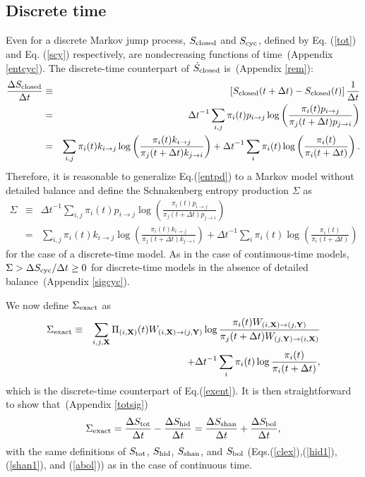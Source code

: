 \documentclass[aps,pre,amsmath,amssymb,floatfix,preprint,nofootinbib]{revtex4}
\begin{document}
\subsection{Discrete time}
Even for a discrete Markov jump process, $S_{\rm closed}$ and $S_{\rm cyc}$, defined by Eq. (\ref{tot}) and Eq. (\ref{scy}) respectively, are nondecreasing functions of time~(Appendix \ref{entcyc})\cite{morimoto}. 
The discrete-time counterpart of $\dot S_{\rm closed}$ is~(Appendix \ref{rem}):
\begin{eqnarray}
\frac{\Delta S_{\rm closed}}{\Delta t} &\equiv& \left[ S_{\rm closed}(t+\Delta t) - S_{\rm closed}(t)\right]\frac{1}{\Delta t} \nonumber\\
&=& {\Delta t}^{-1} \sum_{i,j} \pi_i(t) p_{i \to j}   \log \left(\frac{\pi_i(t) p_{i \to j}}{\pi_j(t +\Delta t) p_{j \to i}}\right) \nonumber\\
&=& \sum_{i,j} \pi_i(t) k_{i \to j}   \log \left(\frac{\pi_i(t) k_{i \to j}}{\pi_j(t +\Delta t) k_{j \to i}}\right) + {\Delta t}^{-1} \sum_{i} \pi_i(t)  \log \left(\frac{\pi_i(t) }{\pi_i(t +\Delta t) }\right)
.\label{entpd}
\end{eqnarray}
 Therefore, it is reasonable to generalize Eq.(\ref{entpd}) to a Markov model without detailed balance and define the Schnakenberg entropy production $\Sigma$ as
\begin{eqnarray}
\Sigma &\equiv& {\Delta t}^{-1} \sum_{i,j} \pi_i(t) p_{i \to j}   \log \left(\frac{\pi_i(t) p_{i \to j}}{\pi_j(t +\Delta t) p_{j \to i}}\right)\nonumber\\
&=& \sum_{i,j} \pi_i(t) k_{i \to j}   \log \left(\frac{\pi_i(t) k_{i \to j}}{\pi_j(t +\Delta t) k_{j \to i}}\right) + {\Delta t}^{-1} \sum_{i} \pi_i(t)   \log \left(\frac{\pi_i(t) }{\pi_i(t +\Delta t) }\right)
\label{schd}
\end{eqnarray}
for the case of a discrete-time model.
As in the case of continuous-time models, $\Sigma > {\Delta S_{\rm cyc}}/{\Delta t} \ge 0$ for discrete-time models in the absence of detailed balance~(Appendix \ref{sigcyc}). 

We now define $\Sigma_{\rm exact}$ as 
\begin{eqnarray}
\Sigma_{\rm exact} &\equiv& \sum_{i,j,{\bf X}}  \Pi_{(i,{\bf X})}(t) W_{(i,{\bf X}) \to (j,{\bf Y})} \log \frac{\pi_{i}(t) W_{(i,{\bf X}) \to (j,{\bf Y})}}{\pi_{j}(t+ \Delta t) W_{(j,{\bf Y}) \to (i,{\bf X})}}\nonumber\\
&&+ \Delta t^{-1} \sum_{i } \pi_{i}(t)  \log \frac{\pi_{i}(t) }{\pi_{i}(t+ \Delta t)}, \label{exd}
\end{eqnarray}
which is the discrete-time counterpart of Eq.(\ref{exent}). It is then straightforward to show that~(Appendix \ref{totsig}) 
\begin{equation}
\Sigma_{\rm exact} = \frac{\Delta S_{\rm tot}}{\Delta t}- \frac{\Delta S_{\rm hid}}{\Delta t} = \frac{\Delta S_{\rm shan}}{\Delta t}+ \frac{\Delta S_{\rm bol}}{\Delta t},\label{fin1}
\end{equation}
with the same definitions of $S_{\rm tot}$, $S_{\rm hid}$, $S_{\rm shan}$, and $S_{\rm bol}$ (Eqs.(\ref{clex}),(\ref{hid1}),(\ref{shan1}), and (\ref{abol})) as in the case of continuous time. 
\end{document}
